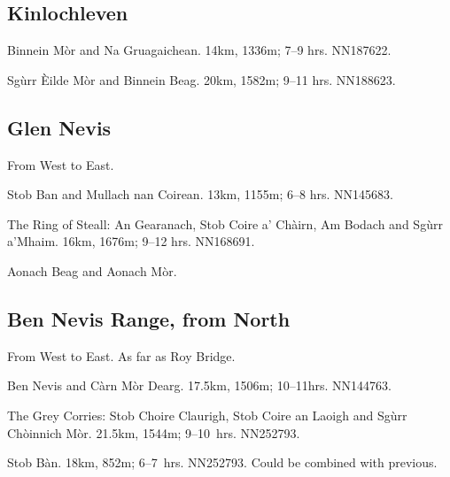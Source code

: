 
\subsection{Kinlochleven}

\begin{munros}
\item\target
Binnein Mòr and Na Gruagaichean.  14km, 1336m; 7--9 hrs.  NN187622. \tick

\item\target
Sgùrr Èilde Mòr and Binnein Beag.  20km, 1582m; 9--11 hrs.  NN188623. \tick
\end{munros}


\subsection{Glen Nevis}

From West to East. 

\begin{munros}
\item\target
Stob Ban  and Mullach nan Coirean.  13km, 1155m; 6--8 hrs. NN145683. \tick

\item\target
The Ring of Steall: An Gearanach, Stob Coire a' Chàirn, Am Bodach and Sgùrr
a'Mhaim.  16km, 1676m; 9--12 hrs.  NN168691.  \tick

\item
Aonach Beag and Aonach Mòr.
\end{munros}



\subsection{Ben Nevis Range, from North}

From West to East.  As far as Roy Bridge. 

\begin{munros}
\item\target
Ben Nevis and Càrn Mòr Dearg.  17.5km, 1506m; 10--11hrs.  NN144763.  \tick

\item\target
The Grey Corries: Stob Choire Claurigh, Stob Coire an Laoigh and Sgùrr
Chòinnich Mòr.   21.5km, 1544m; 9--10~hrs.  NN252793.  \tick

\item
Stob Bàn.  18km, 852m; 6--7~hrs.   NN252793.  Could be combined with previous.
\tick  
\end{munros}
